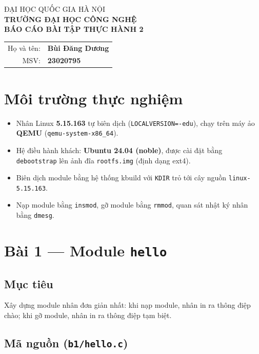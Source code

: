 \documentclass[a4paper,12pt]{article}
\begin{document}
\begin{center}
\large ĐẠI HỌC QUỐC GIA HÀ NỘI\\
\large \textbf{TRƯỜNG ĐẠI HỌC CÔNG NGHỆ} \\[1.2cm]
\Large \textbf{BÁO CÁO BÀI TẬP THỰC HÀNH 2} \\[0.4cm]
\begin{tabular}{rl}
Họ và tên: & \textbf{Bùi Đăng Dương} \\
MSV: & \textbf{23020795} \\
\end{tabular}
\end{center}

\vspace{1cm}
\tableofcontents
\newpage

\section{Môi trường thực nghiệm}
\begin{itemize}[leftmargin=1.2cm]
  \item Nhân Linux \textbf{5.15.163} tự biên dịch (\texttt{LOCALVERSION=-edu}),
        chạy trên máy ảo \textbf{QEMU} (\texttt{qemu-system-x86\_64}).
  \item Hệ điều hành khách: \textbf{Ubuntu 24.04 (noble)}, được cài đặt bằng
        \texttt{debootstrap} lên ảnh đĩa \texttt{rootfs.img} (định dạng ext4).
  \item Biên dịch module bằng hệ thống kbuild với
        \texttt{KDIR} trỏ tới cây nguồn \texttt{linux-5.15.163}.
  \item Nạp module bằng \texttt{insmod}, gỡ module bằng \texttt{rmmod},
        quan sát nhật ký nhân bằng \texttt{dmesg}.
\end{itemize}

\section{Bài 1 --- Module \texttt{hello}}
\subsection{Mục tiêu}
Xây dựng module nhân đơn giản nhất: khi nạp module, nhân in ra thông điệp
chào; khi gỡ module, nhân in ra thông điệp tạm biệt.
\subsection{Mã nguồn (\texttt{b1/hello.c})}

\end{document}
